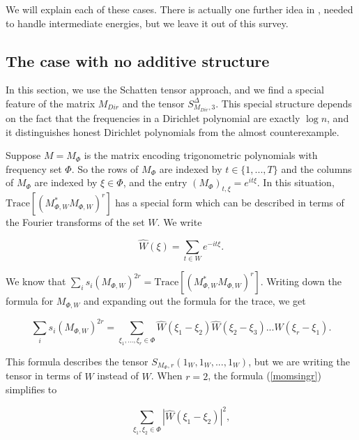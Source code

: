 \documentclass{amsart}
\newcommand{\tr}{\textrm{Trace}}
\begin{document}
 We will explain each of these cases.  There is actually one further idea in \cite{GM}, needed to handle intermediate energies, but we leave it out of this survey.  






\subsection{The case with no additive structure} \label{subsecnoaddstruc}

In this section, we use the Schatten tensor approach,  and we find a special feature of the matrix $M_{Dir}$ and the tensor $S^\Delta_{M_{Dir}, 3}$.  This special structure depends on the fact that the frequencies in a Dirichlet polynomial are exactly $\log n$, and it distinguishes honest Dirichlet polynomials from the almost counterexample.

Suppose $M = M_\Phi$ is the matrix encoding trigonometric polynomials with frequency set $\Phi$.  So the rows of $M_{\Phi}$ are indexed by $t \in \{1, ..., T \}$ and the columns of $M_{\Phi}$ are indexed by $\xi \in \Phi$, and the entry $(M_\Phi)_{t, \xi} = e^{i t \xi}$.  In this situation, $\tr \left[ (M_{\Phi, W}^* M_{\Phi, W})^r \right]$ has a special form which can be described in terms of the Fourier transforms of the set $W$.   We write

$$ \hat W(\xi) = \sum_{t \in W} e^{- i t \xi}.$$

We know that $\sum_i s_i( M_{\Phi, W})^{2r} = \tr \left[ (M_{\Phi, W}^* M_{\Phi, W})^r \right]$.  Writing down the formula for $M_{\Phi, W}$ and expanding out the formula for the trace, we get

\begin{equation} \label{momsingr}
\sum_i s_i( M_{\Phi, W})^{2r} = \sum_{\xi_1, ..., \xi_r \in \Phi} \hat W(\xi_1 - \xi_2) \hat W(\xi_2 - \xi_3) ... \hat W(\xi_r - \xi_1).
\end{equation}



This formula describes the tensor $S_{M_\Phi, r}(1_W, 1_W, ..., 1_W)$, but we are writing the tensor in terms of $\hat W$ instead of $W$.  
When $r=2$,   the formula (\ref{momsingr}) simplifies to 

$$\sum_{\xi_1, \xi_2 \in \Phi} |\hat W(\xi_1 - \xi_2)|^2, $$
\end{document}
